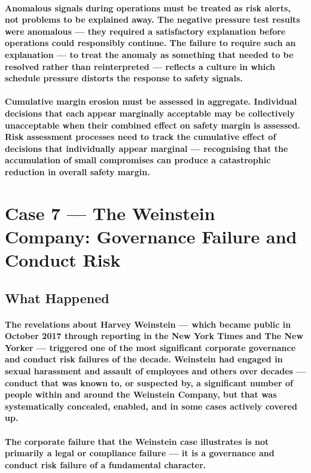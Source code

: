 \paragraph{\textbf{Anomalous signals during operations must be treated as risk alerts, not problems to be explained away}. The negative pressure test results were anomalous — they required a satisfactory explanation before operations could responsibly continue. The failure to require such an explanation — to treat the anomaly as something that needed to be resolved rather than reinterpreted — reflects a culture in which schedule pressure distorts the response to safety signals.}
\paragraph{\textbf{Cumulative margin erosion must be assessed in aggregate}. Individual decisions that each appear marginally acceptable may be collectively unacceptable when their combined effect on safety margin is assessed. Risk assessment processes need to track the cumulative effect of decisions that individually appear marginal — recognising that the accumulation of small compromises can produce a catastrophic reduction in overall safety margin.}

\section{Case 7 — The Weinstein Company: Governance Failure and Conduct Risk}

\subsection{What Happened}
\paragraph{The revelations about Harvey Weinstein — which became public in October 2017 through reporting in the New York Times and The New Yorker — triggered one of the most significant corporate governance and conduct risk failures of the decade. Weinstein had engaged in sexual harassment and assault of employees and others over decades — conduct that was known to, or suspected by, a significant number of people within and around the Weinstein Company, but that was systematically concealed, enabled, and in some cases actively covered up.}
\paragraph{The corporate failure that the Weinstein case illustrates is not primarily a legal or compliance failure — it is a governance and conduct risk failure of a fundamental character.}

